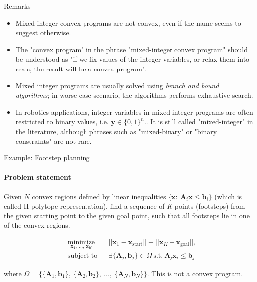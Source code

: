 \documentclass{beamer}
\begin{document}
\begin{frame}{Remarks}
\begin{flushleft}

\begin{itemize}
    \item Mixed-integer convex programs are not convex, even if the name seems to suggest otherwise. 
    \item The "convex program" in the phrase "mixed-integer convex program" should be understood as "if we fix values of the integer variables, or relax them into reals, the result will be a convex program".
    \item Mixed integer programs are usually solved using \emph{branch and bound algorithms}; in worse case scenario, the algorithms performs exhaustive search.
    \item In robotics applications, integer variables in mixed integer programs are often restricted to binary values, i.e. $\mathbf{y} \in \{0, 1\}^n.$. It is still called "mixed-integer" in the literature, although phrases such as "mixed-binary" or "binary constraints" are not rare.
\end{itemize}
 
\end{flushleft}
\end{frame}



\begin{frame}{Example: Footstep planning}
\framesubtitle{Problem statement}
\begin{flushleft}

Given $N$ convex regions defined by linear inequalities $\{ \mathbf{x}: \  \mathbf{A}_i \mathbf{x} \leq \mathbf{b}_i \}$ (which is called H-polytope representation), find a sequence of $K$ points (footsteps) from the given starting point to the given goal point, such that all footsteps lie in one of the convex regions.

\begin{equation}
\begin{aligned}
& \underset{\mathbf{x}_1, \ ..., \ \mathbf{x}_K}{\text{minimize}}
& & ||\mathbf{x}_1 - \mathbf{x}_{\text{start}}|| + ||\mathbf{x}_K - \mathbf{x}_{\text{goal}}||, \\
& \text{subject to}
& & \exists \{ \mathbf{A}_j, \mathbf{b}_j\} \in \Omega \ \text{s.t.} \ \mathbf{A}_j\mathbf{x}_i \leq \mathbf{b}_j
\end{aligned}
\end{equation}

\bigskip

where $\Omega = \{ \{ \mathbf{A}_1, \mathbf{b}_1\}, \ \{ \mathbf{A}_2, \mathbf{b}_2\}, \ ..., \ \{ \mathbf{A}_N, \mathbf{b}_N\} \}$. This is not a convex program.
 
\end{flushleft}
\end{frame}
\end{document}
